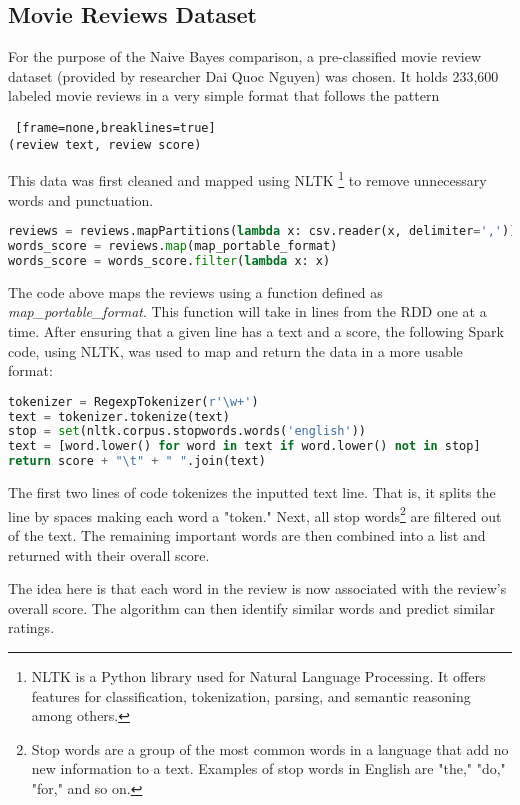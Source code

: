 \documentclass[9pt,twocolumn,twoside]{idsi}
\begin{document}
\subsection{Movie Reviews Dataset}
For the purpose of the Naive Bayes comparison, a pre-classified movie review dataset (provided by researcher Dai Quoc Nguyen)\cite{nguyenWASSA2014NVP}  was chosen. It holds 233,600 labeled movie reviews in a very simple format that follows the pattern 
\begin{lstlisting} [frame=none,breaklines=true]
(review text, review score)
\end{lstlisting}
This data was first cleaned and mapped using NLTK \footnote{NLTK is a Python library used for Natural Language Processing. It offers features for classification, tokenization, parsing, and semantic reasoning among others.} to remove unnecessary words and punctuation. 
\begin{lstlisting}[language=Python, breaklines=true]
reviews = reviews.mapPartitions(lambda x: csv.reader(x, delimiter=','))
words_score = reviews.map(map_portable_format)
words_score = words_score.filter(lambda x: x)
\end{lstlisting}
The code above maps the reviews using a function defined as \textit{map\_portable\_format}. This function will take in lines from the RDD one at a time. After ensuring that a given line has a text and a score, the following Spark code, using NLTK, was used to map and return the data in a more usable format:
\begin{lstlisting}[language=Python, breaklines=true]
tokenizer = RegexpTokenizer(r'\w+')
text = tokenizer.tokenize(text)
stop = set(nltk.corpus.stopwords.words('english'))
text = [word.lower() for word in text if word.lower() not in stop]
return score + "\t" + " ".join(text)
\end{lstlisting}
The first two lines of code tokenizes the inputted text line. That is, it splits the line by spaces making each word a "token." Next, all stop words\footnote{Stop words are a group of the most common words in a language that add no new information to a text. Examples of stop words in English are "the," "do," "for," and so on.} are filtered out of the text. The remaining important words are then combined into a list and returned with their overall score. 

The idea here is that each word in the review is now associated with the review's overall score. The algorithm can then identify similar words and predict similar ratings.
\end{document}
